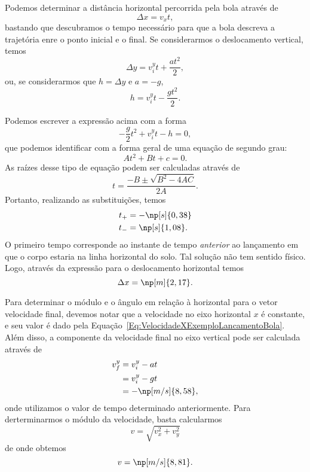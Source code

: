 Podemos determinar a distância horizontal percorrida pela bola através de
\begin{equation}
	\Delta x = v_x t,
\end{equation}
%
bastando que descubramos o tempo necessário para que a bola descreva a trajetória enre o ponto inicial e o final. Se considerarmos o deslocamento vertical, temos
\begin{equation}
	\Delta y = v_{i}^{y}t + \frac{at^2}{2},
\end{equation}
%
ou, se considerarmos que $h = \Delta y$ e $a = -g$,
\begin{equation}
	h = v_{i}^{y} t - \frac{gt^2}{2}.
\end{equation}

Podemos escrever a expressão acima com a forma
\begin{equation}
	-\frac{g}{2}t^2 + v_{i}^{y} t - h = 0,
\end{equation}
%
que podemos identificar com a forma geral de uma equação de segundo grau:
\begin{equation}
	At^2 + Bt + c = 0.
\end{equation}
%
As raízes desse tipo de equação podem ser calculadas através de
\begin{equation}
	t = \frac{-B \pm \sqrt{B^2 - 4 A C}}{2A}.
\end{equation}
%
Portanto, realizando as substituições, temos
\begin{align}
	t_{+} &= -\np[s]{0,38} \\
	t_{-} &= \np[s]{1,08}.
\end{align}
%
O primeiro tempo corresponde ao instante de tempo \emph{anterior} ao lançamento em que o corpo estaria na linha horizontal do solo. Tal solução não tem sentido físico. Logo, através da expressão para o deslocamento horizontal temos
\begin{equation}
	\Delta x = \np[m]{2,17}.
\end{equation}

Para determinar o módulo e o ângulo em relação à horizontal para o vetor velocidade final, devemos notar que a velocidade no eixo horizontal $x$ é constante, e seu valor é dado pela Equação~\eqref{Eq:VelocidadeXExemploLancamentoBola}. Além disso, a componente da velocidade final no eixo vertical pode ser calculada através de
\begin{align}
	v_{f}^{y} &= v_{i}^{y} - at \\
	&= v_{i}^{y} - gt \\
	&= -\np[m/s]{8,58},
\end{align}
%
onde utilizamos o valor de tempo determinado anteriormente. Para derterminarmos o módulo da velocidade, basta calcularmos
\begin{equation}
	v = \sqrt{v_x^2 + v_y^2}
\end{equation}
%
de onde obtemos
\begin{equation}
	v = \np[m/s]{8,81}.
\end{equation}


